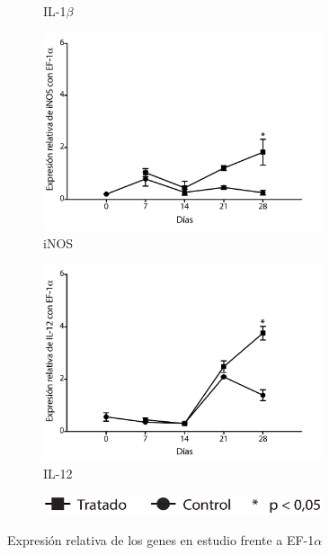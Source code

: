 \documentclass[12pt,letterpaper,oneside]{scrbook}
\begin{document}
\begin{figure}[h!]
\begin{subfigure}{0.5\textwidth}
        \caption{IL-1$\beta$}
        \label{fig:qpcr:il1b}
    \end{subfigure}
    \begin{subfigure}{0.5\textwidth}
        \includegraphics[width=0.9\textwidth]{eps/qPCR/pdf/qinos}
        \caption{iNOS}
        \label{fig:qpcr:inos}
    \end{subfigure}
    \begin{subfigure}{0.5\textwidth}
        \includegraphics[width=0.9\textwidth]{eps/qPCR/pdf/qil12}
        \caption{IL-12}
        \label{fig:qpcr:il12}
    \end{subfigure}
    \begin{subfigure}{0.5\textwidth}
        \includegraphics[width=0.9\textwidth]{eps/qPCR/leyenda}
    \end{subfigure}
    \caption{Expresión relativa de los genes en estudio frente a EF-1$\alpha$}
    \label{fig:qpcr}
\end{figure}
\end{document}
